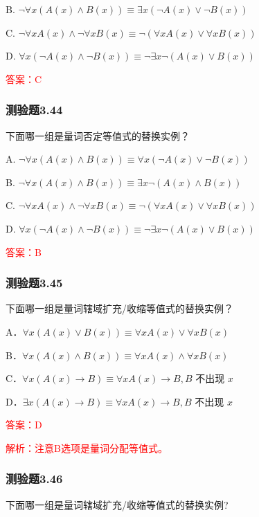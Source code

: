 \documentclass[UTF8, heading=true]{ctexart}
\begin{document}
B. $\neg \forall x(A(x) \wedge B(x)) \equiv \exists x(\neg A(x) \vee \neg B(x))$

C. $\neg \forall x A(x) \wedge \neg \forall x B(x) \equiv \neg(\forall x A(x) \vee \forall x B(x))$

D. $\forall x(\neg A(x) \wedge \neg B(x)) \equiv \neg \exists x \neg(A(x) \vee B(x))$

\textcolor{red}{答案：C}

\subsubsection{测验题3.44}

下面哪一组是量词否定等值式的替换实例？

A. $\neg \forall x(A(x) \wedge B(x)) \equiv \forall x(\neg A(x) \vee \neg B(x))$

B. $\neg \forall x(A(x) \wedge B(x)) \equiv \exists x \neg(A(x) \wedge B(x))$

C. $\neg \forall x A(x) \wedge \neg \forall x B(x) \equiv \neg(\forall x A(x) \vee \forall x B(x))$

D. $\forall x(\neg A(x) \wedge \neg B(x)) \equiv \neg \exists x \neg(A(x) \vee B(x))$


\textcolor{red}{答案：B}

\subsubsection{测验题3.45}

下面哪一组是量词辖域扩充/收缩等值式的替换实例？

A．$\forall x(A(x) \vee B(x)) \equiv \forall x A(x) \vee \forall x B(x)$

B．$\forall x(A(x) \wedge B(x)) \equiv \forall x A(x) \wedge \forall x B(x)$

C．$\forall x(A(x) \rightarrow B) \equiv \forall x A(x) \rightarrow B, B$ 不出现 $x$

D．$\exists x(A(x) \rightarrow B) \equiv \forall x A(x) \rightarrow B, B$ 不出现 $x$

\textcolor{red}{答案：D}

\textcolor{red}{解析：注意B选项是量词分配等值式。}

\subsubsection{测验题3.46}

下面哪一组是量词辖域扩充/收缩等值式的替换实例?
\end{document}
